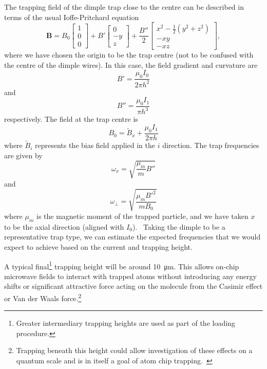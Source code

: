 The trapping field of the dimple trap close to the centre can be described in
terms of the usual Ioffe-Pritchard equation~\cite{Foot2005}
%
\begin{equation}
  \mathbf{B} = B_0 \begin{bmatrix} 1 \\ 0 \\0 \end{bmatrix}
               + B' \begin{bmatrix} 0 \\ -y \\ z \end{bmatrix}
               + \frac{B''}{2} \begin{bmatrix} 
                  x^2 - \frac{1}{2}(y^2 + z^2) \\
                  -xy \\
                  -xz
               \end{bmatrix},
\end{equation}
%
where we have chosen the origin to be the trap centre (not to be confused with
the centre of the dimple wires). In this case, the field gradient and curvature
are
%
\begin{equation}
  B' = \frac{\mu_0 I_0}{2\pi h^2}
\end{equation}
%
and
%
\begin{equation}
  B'' = \frac{\mu_0 I_1}{\pi h^3}
\end{equation}
%
respectively. The field at the trap centre is
%
\begin{equation}
  B_0 = \widetilde{B}_x + \frac{\mu_0 I_1}{2\pi h}
\end{equation}
%
where $\widetilde{B}_i$ represents the bias field applied in the $i$ direction.
The trap frequencies are given by
\begin{equation}
  \omega_x = \sqrt{\frac{\mu_m}{m}B''}
  \label{litrev:eqn:axisfreq}
\end{equation}
and
\begin{equation}
  \omega_\perp = \sqrt{\frac{\mu_m {B'}^2}{m B_0}}
  \label{litrev:eqn:transfreq}
\end{equation}
where $\mu_m$ is the magnetic moment of the trapped particle, and we have taken
$x$ to be the axial direction (aligned with $I_0$).~\cite{2011Ac}
Taking the dimple to be a representative trap type, we can estimate the expected
frequencies that we would expect to achieve based on the current and trapping
height.

 A
typical final\footnote{Greater intermediary trapping heights are used as part of
the loading procedure.} trapping height will be around \SI{10}{\micro\metre}.
This allows on-chip microwave fields to interact with trapped atoms without
introducing any energy shifts   or significant attractive force acting on the
molecule from the Casimir effect or Van der Waals force.\footnote{Trapping
beneath this height could allow investigation of these effects on a quantum
scale and is in itself a goal of atom chip
trapping.~\cite{PhysRevA.56.R3350}}~\cite{2011Ac}


